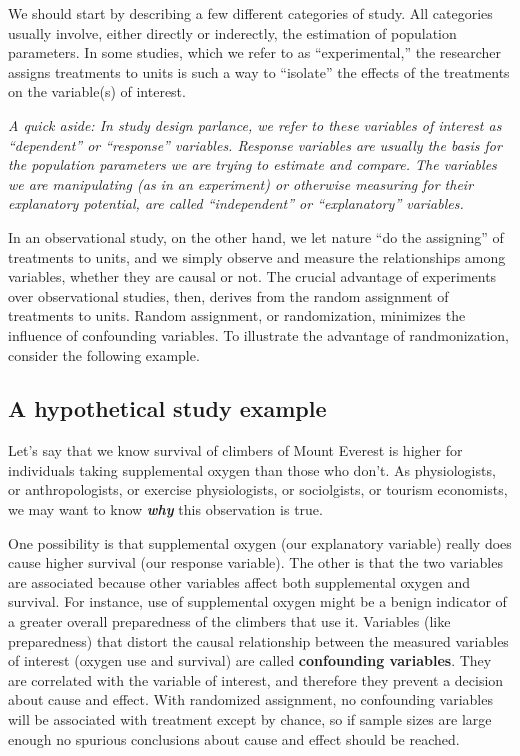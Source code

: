 \documentclass[]{book}
\begin{document}
We should start by describing a few different categories of study. All categories usually involve, either directly or inderectly, the estimation of population parameters. In some studies, which we refer to as ``experimental,'' the researcher assigns treatments to units is such a way to ``isolate'' the effects of the treatments on the variable(s) of interest.

\emph{A quick aside: In study design parlance, we refer to these variables of interest as ``dependent'' or ``response'' variables. Response variables are usually the basis for the population parameters we are trying to estimate and compare. The variables we are manipulating (as in an experiment) or otherwise measuring for their explanatory potential, are called ``independent'' or ``explanatory'' variables.}

In an observational study, on the other hand, we let nature ``do the assigning'' of treatments to units, and we simply observe and measure the relationships among variables, whether they are causal or not. The crucial advantage of experiments over observational studies, then, derives from the random assignment of treatments to units. Random assignment, or randomization, minimizes the influence of confounding variables. To illustrate the advantage of randmonization, consider the following example.

\hypertarget{a-hypothetical-study-example}{%
\subsection{A hypothetical study example}\label{a-hypothetical-study-example}}

Let's say that we know survival of climbers of Mount Everest is higher for individuals taking supplemental oxygen than those who don't. As physiologists, or anthropologists, or exercise physiologists, or sociolgists, or tourism economists, we may want to know \textbf{\emph{why}} this observation is true.

One possibility is that supplemental oxygen (our explanatory variable) really does cause higher survival (our response variable). The other is that the two variables are associated because other variables affect both supplemental oxygen and survival. For instance, use of supplemental oxygen might be a benign indicator of a greater overall preparedness of the climbers that use it. Variables (like preparedness) that distort the causal relationship between the measured variables of interest (oxygen use and survival) are called \textbf{confounding variables}. They are correlated with the variable of interest, and therefore they prevent a decision about cause and effect. With randomized assignment, no confounding variables will be associated with treatment except by chance, so if sample sizes are large enough no spurious conclusions about cause and effect should be reached.
\end{document}
